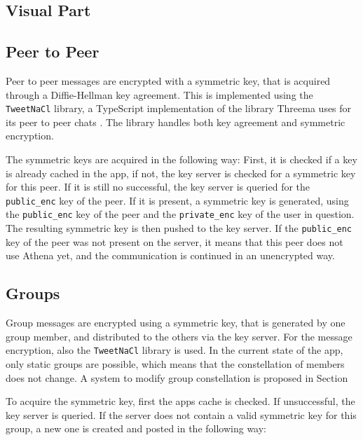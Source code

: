 \documentclass[a4paper, oneside]{discothesis}
\begin{document}
\subsection{Visual Part}


\subsection{Peer to Peer}

Peer to peer messages are encrypted with a symmetric key, that is acquired through a Diffie-Hellman key agreement. This is implemented using the \texttt{TweetNaCl} library, a TypeScript implementation of the library Threema uses for its peer to peer chats \cite{Threema, TweetNaCl}. The library handles both key agreement and symmetric encryption.

The symmetric keys are acquired in the following way: First, it is checked if a key is already cached in the app, if not, the key server is checked for a symmetric key for this peer. If it is still no successful, the key server is queried for the \texttt{public\_enc} key of the peer. If it is present, a symmetric key is generated, using the \texttt{public\_enc} key of the peer and the \texttt{private\_enc} key of the user in question. The resulting symmetric key is then pushed to the key server. If the \texttt{public\_enc} key of the peer was not present on the server, it means that this peer does not use Athena yet, and the communication is continued in an unencrypted way.

\subsection{Groups}

Group messages are encrypted using a symmetric key, that is generated by one group member, and distributed to the others via the key server. For the message encryption, also the \texttt{TweetNaCl} library is used. In the current state of the app, only static groups are possible, which means that the constellation of members does not change. A system to modify group constellation is proposed in Section 



To acquire the symmetric key, first the apps cache is checked. If unsuccessful, the key server is queried. If the server does not contain a valid symmetric key for this group, a new one is created and posted in the following way:
\end{document}
